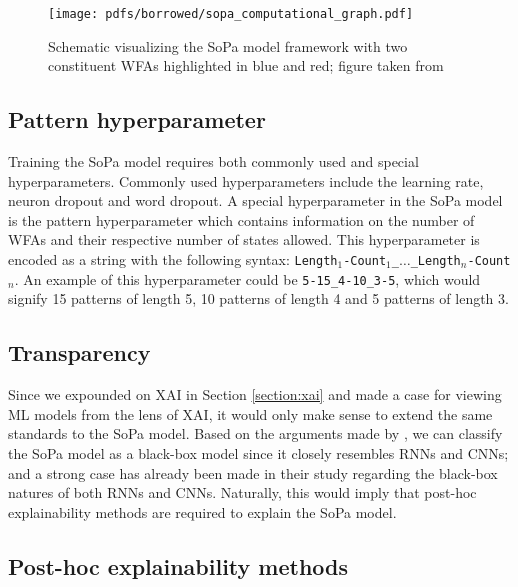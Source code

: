 \begin{figure}[t]
  \centering
  \texttt{[image: pdfs/borrowed/sopa\_computational\_graph.pdf]}
  \caption{Schematic visualizing the SoPa model framework with two constituent
    WFAs highlighted in blue and red; figure taken from
    \citet{schwartz2018sopa}}
  \label{fig:sopa}
\end{figure}

\subsection{Pattern hyperparameter}

Training the SoPa model requires both commonly used and special hyperparameters.
Commonly used hyperparameters include the learning rate, neuron dropout and word
dropout. A special hyperparameter in the SoPa model is the pattern
hyperparameter which contains information on the number of WFAs and their
respective number of states allowed. This hyperparameter is encoded as a string
with the following syntax:
\texttt{Length$_{1}$-Count$_{1}$\_$\dots$\_Length$_{n}$-Count$_{n}$}. An example
of this hyperparameter could be \texttt{5-15\_4-10\_3-5}, which would signify 15 patterns of length 5, 10 patterns of length 4 and 5 patterns of length 3.

\subsection{Transparency}

\label{section:sopa_transparency}

Since we expounded on XAI in Section \ref{section:xai} and made a case for
viewing ML models from the lens of XAI, it would only make sense to extend the
same standards to the SoPa model. Based on the arguments made by
\citet{arrieta2020explainable}, we can classify the SoPa model as a black-box
model since it closely resembles RNNs and CNNs; and a strong case has already
been made in their study regarding the black-box natures of both RNNs and CNNs.
Naturally, this would imply that post-hoc explainability methods are required to
explain the SoPa model.

\subsection{Post-hoc explainability methods}

\label{section:sopa_post_hoc}


